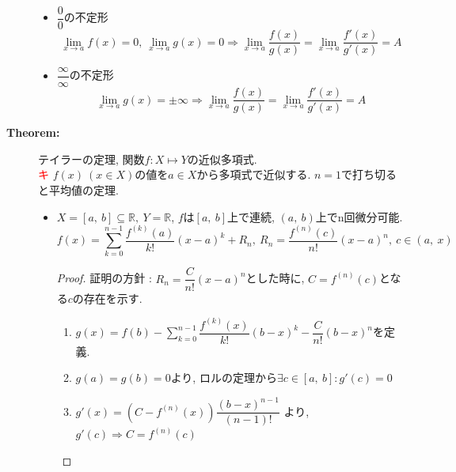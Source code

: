 \documentclass[dvipdfmx]{jsarticle}
\newcommand{\point}{\textcircled{\textcolor{red}{\scriptsize キ}} }
\begin{document}
\begin{description}
\begin{itemize}
            \item $\dfrac{0}{0}$の不定形
                $$\lim_{x \to a} f(x) = 0,\ \lim_{x \to a} g(x) = 0 \Rightarrow \lim_{x \to a} \dfrac{f(x)}{g(x)} = \lim_{x \to a} \dfrac{f'(x)}{g'(x)} = A$$
            \item $\dfrac{\infty}{\infty}$の不定形
                $$\lim_{x \to a} g(x) = \pm \infty \Rightarrow \lim_{x \to a} \dfrac{f(x)}{g(x)} = \lim_{x \to a} \dfrac{f'(x)}{g'(x)} = A$$
        \end{itemize}
    \item[\bf{Theorem:}] テイラーの定理, 関数$f : X \mapsto Y$の近似多項式. \\
        \point $f(x) \ (x \in X)$の値を$a \in X$から多項式で近似する. $n = 1$で打ち切ると平均値の定理.
        \begin{itemize}
            \item $X = [a,\ b] \subseteq \mathbb{R},\ Y = \mathbb{R}$, $f$は$[a,\ b]$上で連続, $(a,\ b)$上でn回微分可能. 
                $$ f(x) = \sum_{k = 0}^{n-1} \dfrac{f^{(k)}(a)}{k!}(x-a)^k + R_n,\ R_n = \dfrac{f^{(n)}(c)}{n!}(x-a)^n,\ c \in (a,\ x) $$
                \begin{proof} 証明の方針 : $R_n = \dfrac{C}{n!}(x-a)^n$とした時に, $C = f^{(n)}(c)$となる$c$の存在を示す.
                    \begin{enumerate}
                        \item $g(x) = f(b) - \displaystyle \sum_{k = 0}^{n-1} \dfrac{f^{(k)}(x)}{k!}(b-x)^k - \dfrac{C}{n!}(b-x)^n$を定義.
                        \item $g(a) = g(b) = 0$より, ロルの定理から$\exists c \in [a,\ b] : g'(c) = 0$
                        \item $g'(x) = (C - f^{(n)}(x))\dfrac{(b-x)^{n-1}}{(n-1)!}$ より, $g'(c) \Rightarrow C = f^{(n)}(c)$      
                    \end{enumerate}
                \end{proof}


\end{itemize}
\end{description}
\end{document}
